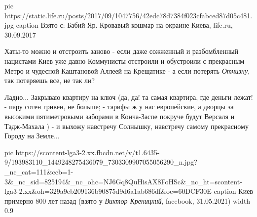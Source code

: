 \ifcmt
  pic https://static.life.ru/posts/2017/09/1047756/42edc78d7384f023cfabced87d05c481.jpg
  caption Взято с: Бабий Яр. Кровавый кошмар на окраине Киева, life.ru, 30.09.2017
\fi

Хаты-то можно и отстроить заново - если даже сожженный и разбомбленный
нацистами Киев уже давно Коммунисты отстроили и обустроили с прекрасным Метро и
чудесной Каштановой Аллеей на Крещатике - а если потерять \emph{Отчизну}, так
потеряешь все, не так ли?

Ладно... Закрываю квартиру на ключ (да, да! та самая квартира, где деньги
лежат! - пару сотен гривен, не больше; - тарифы ж у нас европейские, а дворцы
за высокими пятиметровыми заборами в Конча-Заспе покруче будут Версаля и
Тадж-Махала ) - и выхожу навстречу Солнышку, навстречу самому прекрасному
Городу на Земле... 

\ifcmt
  pic https://scontent-lga3-2.xx.fbcdn.net/v/t1.6435-9/193983110_1449248275436079_7303309907055056290_n.jpg?_nc_cat=111&ccb=1-3&_nc_sid=825194&_nc_ohc=NJ6Gq8QuHisAX8FoHSc&_nc_ht=scontent-lga3-2.xx&oh=329a9eb209136b90875d9d6a1ab686df&oe=60DCF30E
  caption Киев примерно 800 лет назад (взято у \emph{Виктор Креницкий}, facebook, 31.05.2021)
  width 0.9
\fi
